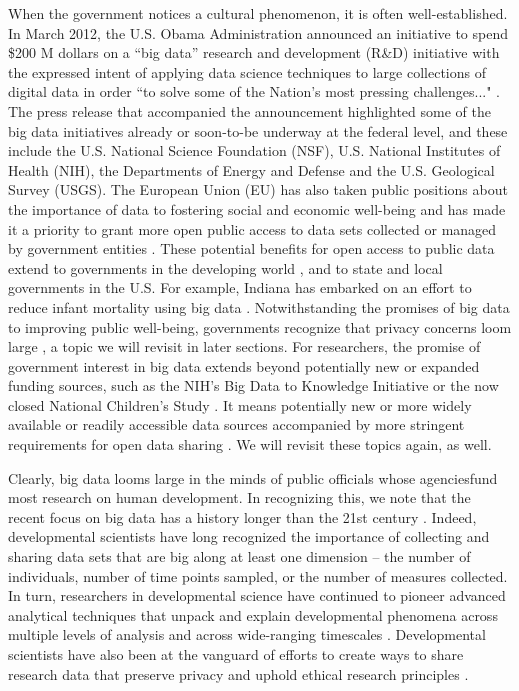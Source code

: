 \documentclass[letterpaper,man,apacite]{apa6}
\begin{document}
When the government notices a cultural phenomenon, it is often well-established. 
In March 2012, the U.S. Obama Administration announced an initiative to spend \$200 M dollars on a ``big data'' research and development (R\&D) initiative \cite{Gianchandani2012, Obama2012} with the expressed intent of applying data science techniques to large collections of digital data in order ``to solve some of the Nation's most pressing challenges..." \cite{Obama2012}.
The press release that accompanied the announcement \cite{Obama2012} highlighted some of the big data initiatives already or soon-to-be underway at the federal level, and these include the U.S. National Science Foundation (NSF), U.S. National Institutes of Health (NIH), the Departments of Energy and Defense and the U.S. Geological Survey (USGS).
The European Union (EU) has also taken public positions \cite{EU2013} about the importance of data to fostering social and economic well-being and has made it a priority to grant more open public access to data sets collected or managed by government entities \cite{EU2015}.
These potential benefits for open access to public data extend to governments in the developing world \cite{Malik2015}, and to state and local governments in the U.S.
For example, Indiana has embarked on an effort to reduce infant mortality using big data \cite{Ravindranath2014}.
Notwithstanding the promises of big data to improving public well-being, governments recognize that privacy concerns loom large \cite{Obama2014}, a topic we will revisit in later sections.
For researchers, the promise of government interest in big data extends beyond potentially new or expanded funding sources, such as the NIH's Big Data to Knowledge Initiative \cite{BD2K2015} or the now closed National Children's Study \cite{NCS2015}.
It means potentially new or more widely available or readily accessible data sources accompanied by more stringent requirements for open data sharing \cite{NIMH2015, NSF2011}.
We will revisit these topics again, as well.

Clearly, big data looms large in the minds of public officials whose agenciesfund most research on human development.
In recognizing this, we note that the recent focus on big data has a history longer than the 21st century \cite{Press2013a}.
Indeed, developmental scientists have long recognized the importance of collecting and sharing data sets that are big along at least one dimension -- the number of individuals, number of time points sampled, or the number of measures collected.
In turn, researchers in developmental science have continued to pioneer advanced analytical techniques that unpack and explain developmental phenomena across multiple levels of analysis and across wide-ranging timescales \cite{CDS2014, QuantDev}.
Developmental scientists have also been at the vanguard of efforts to create ways to share research data that preserve privacy and uphold ethical research principles \cite{Adolph2012, AERA2011, AERAVideo2015, Bakeman2011, Databrary2015}.
\end{document}

